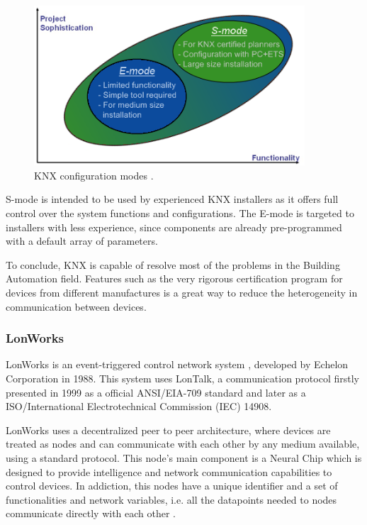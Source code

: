 \begin{figure}[H]
	\centering
	\includegraphics[width=0.9\textwidth]{figures/knx_modes.png}
	\caption{KNX configuration modes \cite{knx}. }
	\label{fig:knx_modes}
\end{figure}
 
 S-mode is intended to be used by experienced KNX installers as it offers full control over the system functions and configurations. The E-mode is targeted to installers with less experience, since components are already pre-programmed with a default array of parameters.
 
To conclude, KNX is capable of resolve most of the problems in the Building Automation field. Features such as the very rigorous certification program for devices from different manufactures is a great way to reduce the heterogeneity in communication between devices.

 
\subsubsection{LonWorks}

LonWorks is an event-triggered control network system \cite{Osorio}, developed by Echelon Corporation \cite{echelon} in 1988. This system uses LonTalk, a communication protocol firstly presented in 1999 as a official ANSI/EIA-709 standard and later as a ISO/International Electrotechnical Commission (IEC) 14908.

LonWorks uses a decentralized peer to peer architecture, where devices are treated as nodes and can communicate with each other by any medium available, using a standard protocol. This node's main component is a Neural Chip which is designed to provide intelligence and network communication capabilities to control devices. In addiction, this nodes have a unique identifier and a set of functionalities and network variables, i.e. all the datapoints needed to nodes communicate directly with each other \cite{Domingues2016}.

